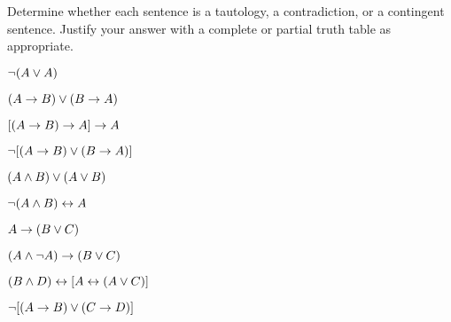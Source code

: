 \noindent\problempart
\label{pr.TT.TTorC4}
Determine whether each sentence is a tautology, a contradiction, or a contingent sentence. Justify your answer with a complete or partial truth table as appropriate.
\begin{compactlist}
\item  $\neg (A \vee A)$\vspace{.5ex}		\hfill			{}	%
\item $(A \rightarrow B) \vee (B \rightarrow A)$\vspace{.5ex}	\hfill		{}	%
\item $[(A \rightarrow B) \rightarrow A] \rightarrow A$\vspace{.5ex}	\hfill			{}   %
\item $\neg[( A \rightarrow B) \vee (B \rightarrow A)]$\vspace{.5ex}	\hfill		{}	%
\item $(A \wedge B) \vee (A \vee B)$\vspace{.5ex} 	\hfill			{}	%
\item $\neg(A\wedge B) \leftrightarrow A$\vspace{.5ex} 		\hfill			{}	%
\item $A\rightarrow(B\vee C)$\vspace{.5ex} 				\hfill			{}	%
\item $(A \wedge\neg A) \rightarrow (B \vee C)$\vspace{.5ex} 	\hfill		{}	%
\item $(B\wedge D) \leftrightarrow [A \leftrightarrow(A \vee C)]$\vspace{.5ex}\hfill		{}	%
\item $\neg[(A \rightarrow B) \vee (C \rightarrow D)]$\vspace{.5ex} 	\hfill		{}	%
\end{compactlist}



